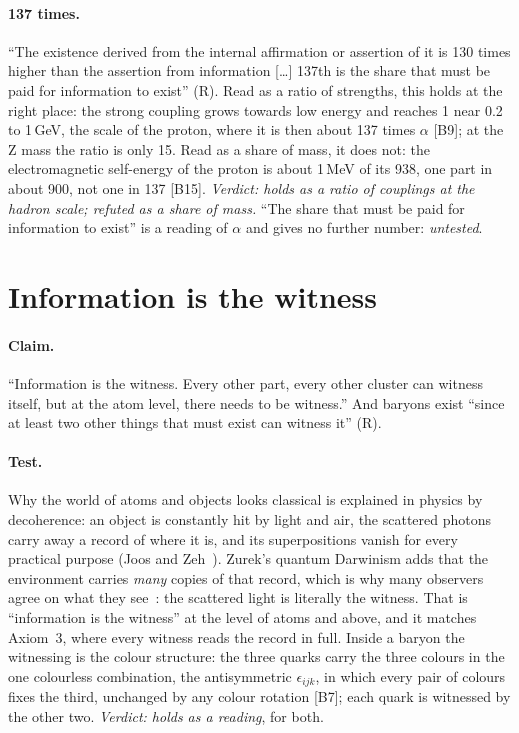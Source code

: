 \documentclass[11pt,a4paper]{article}
\theoremstyle{definition}
\newcommand{\chk}[1]{\textsf{[#1]}}
\newcommand{\tagR}{\textsf{(R)}}
\begin{document}
\paragraph{137 times.} ``The existence derived from the internal affirmation or assertion of it is 130 times higher than the assertion from
information [\dots] 137th is the share that must be paid for information to exist'' \tagR. Read as a ratio of strengths, this holds at the
right place: the strong coupling grows towards low energy and reaches 1 near 0.2 to 1\,GeV, the scale of the proton, where it is then about
137 times $\alpha$ \chk{B9}; at the Z mass the ratio is only 15. Read as a share of mass, it does not: the electromagnetic self-energy of the
proton is about 1\,MeV of its 938, one part in about 900, not one in 137 \chk{B15}. \emph{Verdict: holds as a ratio of couplings at the
hadron scale; refuted as a share of mass.} ``The share that must be paid for information to exist'' is a reading of $\alpha$ and gives no
further number: \emph{untested}.

\section{Information is the witness}\label{sec:witness}

\paragraph{Claim.} ``Information is the witness. Every other part, every other cluster can witness itself, but at the atom level, there
needs to be witness.'' And baryons exist ``since at least two other things that must exist can witness it'' \tagR.

\paragraph{Test.} Why the world of atoms and objects looks classical is explained in physics by decoherence: an object is constantly hit by
light and air, the scattered photons carry away a record of where it is, and its superpositions vanish for every practical purpose (Joos and
Zeh~\cite{jz}). Zurek's quantum Darwinism adds that the environment carries \emph{many} copies of that record, which is why many observers
agree on what they see~\cite{zurek}: the scattered light is literally the witness. That is ``information is the witness'' at the level of
atoms and above, and it matches Axiom~3, where every witness reads the record in full. Inside a baryon the witnessing is the colour
structure: the three quarks carry the three colours in the one colourless combination, the antisymmetric $\epsilon_{ijk}$, in which every
pair of colours fixes the third, unchanged by any colour rotation \chk{B7}; each quark is witnessed by the other two. \emph{Verdict: holds as
a reading}, for both.
\end{document}
